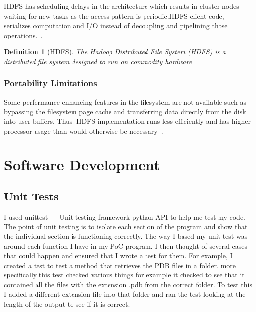 \documentclass{report}
\newtheorem{definition}{Definition}[section]
\begin{document}
HDFS has scheduling delays in the architecture which results in cluster nodes waiting for new tasks as the access pattern is periodic.HDFS client code, serializes computation and I/O instead of decoupling and pipelining those operations.~\cite{shafer_hadoop_2010}.

\begin{definition}[HDFS]
    The Hadoop Distributed File System (HDFS) is a distributed file system designed to run on commodity hardware
\end{definition}

\subsubsection{Portability Limitations}
Some performance-enhancing features in the filesystem are not available such as bypassing the filesystem page cache and transferring data directly from the disk into user buffers. Thus, HDFS implementation runs less efficiently and has higher processor usage than would otherwise be necessary~\cite{shafer_hadoop_2010}.


\section{Software Development}

\subsection{Unit Tests}

I used unittest — Unit testing framework python API to help me test my code. The point of unit testing is to isolate each section of the program and show that the individual section is functioning correctly. The way I based my unit test was around each function I have in my PoC program. I then thought of several cases that could happen and ensured that I wrote a test for them. For example, I created a test to test a method that retrieves the PDB files in a folder. more specifically this test checked various things for example it checked to see that it contained all the files with the extension .pdb from the correct folder. To test this I added a different extension file into that folder and ran the test looking at the length of the output to see if it is correct. 
\end{document}

